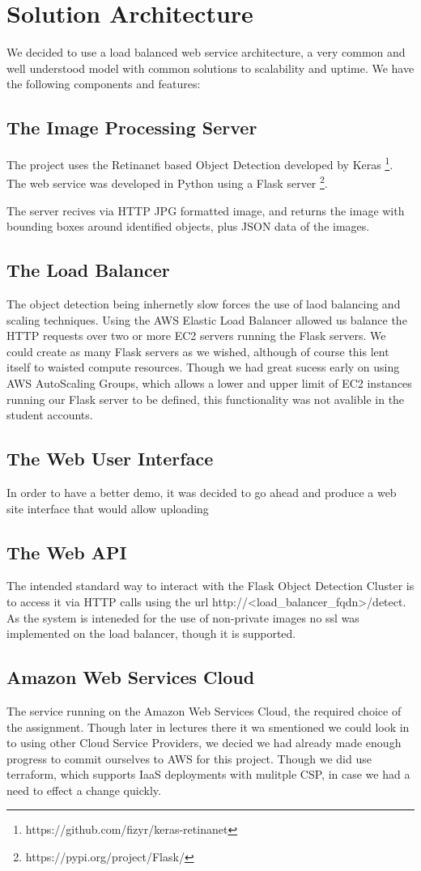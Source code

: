 \documentclass[conference]{IEEEtran}
\begin{document}
\section{Solution Architecture}
We decided to use a load balanced web service architecture, a very common and well understood model with common solutions to scalability and uptime. We have the following components and features:
\subsection{The Image Processing Server}
The project uses the Retinanet based Object Detection developed by Keras
\footnote{https://github.com/fizyr/keras-retinanet}. The web service was developed in Python using a Flask server \footnote{https://pypi.org/project/Flask/}.\par
The server recives via HTTP JPG formatted image, and returns the image with bounding boxes around identified objects, plus JSON data of the images.
\subsection{The Load Balancer}
The object detection being inhernetly slow forces the use of laod balancing and scaling techniques. Using the AWS Elastic Load Balancer allowed us balance the HTTP requests over two or more EC2 servers running the Flask servers. We could create as many Flask servers as we wished, although of course this lent itself to waisted compute resources. Though we had great sucess early on using AWS AutoScaling Groups, which allows a lower and upper limit of EC2 instances running our Flask server to be defined, this functionality was not avalible in the student accounts.
\subsection{The Web User Interface}
In order to have a better demo, it was decided to go ahead and produce a web site interface that would allow uploading 
\subsection{The Web API}
The intended standard way to interact with the Flask Object Detection Cluster is to access it via HTTP calls using the url http://\textless load\_balancer\_fqdn\textgreater/detect. As the system is inteneded for the use of non-private images no ssl was implemented on the load balancer, though it is supported.
\subsection{Amazon Web Services Cloud}
The service running on the Amazon Web Services Cloud, the required choice of the assignment. Though later in lectures there it wa smentioned we could look in to using other Cloud Service Providers, we decied we had already made enough progress to commit ourselves to AWS for this project. Though we did use terraform, which supports IaaS deployments with mulitple CSP, in case we had a need to effect a change quickly.
\end{document}
